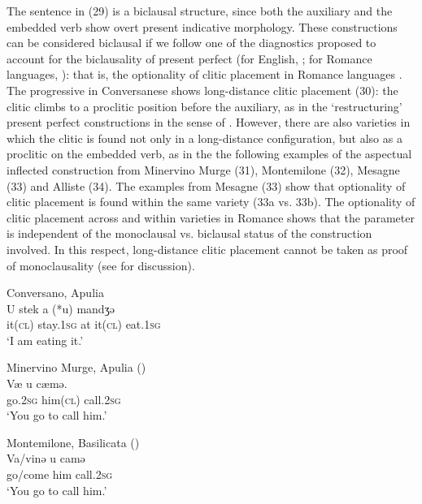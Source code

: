 \documentclass[output=paper]{langsci/langscibook}
\begin{document}
The sentence in (29) is a biclausal structure, since both the auxiliary and the embedded verb show overt present indicative morphology. These constructions can be considered biclausal if we follow one of the diagnostics proposed to account for the biclausality of present perfect (for English, \citealt{Chomsky1957,Chomsky1981,Chomsky1995}; for Romance languages, \citealt{Kayne1993,Manzini2005,Manzini2007,Manzini2011Bio}): that is, the optionality of clitic placement in Romance languages \citep{Manzini2011Bio}. The progressive in Conversanese shows long-distance clitic placement (30): the clitic climbs to a proclitic position before the auxiliary, as in the ‘restructuring’ present perfect constructions in the sense of \citet{Rizzi1982}. However, there are also varieties in which the clitic is found not only in a long-distance configuration, but also as a proclitic on the embedded verb, as in the the following examples of the aspectual inflected construction from Minervino Murge (31), Montemilone (32), Mesagne (33) and Alliste (34). The examples from Mesagne (33) show that optionality of clitic placement is found within the same variety (33a vs. 33b). The optionality of clitic placement across and within varieties in Romance shows that the parameter is independent of the monoclausal vs. biclausal status of the construction involved. In this respect, long-distance clitic placement cannot be taken as proof of monoclausality (see \citealt{Manzini2011Bio,Manzini2017} for discussion).

\ea%
         Conversano, Apulia\label{ex:lorusso:30}\\
    \gll U   stek    a   (*u)  mandʒə \\
         it\textsc{(cl)} stay.\textsc{1sg} at  it\textsc{(cl)} eat.\textsc{1sg} \\
    \glt ‘I am eating it.’
\z

\ea%
         Minervino Murge, Apulia (\citealt{Manzini2005})\label{ex:lorusso:31}\\
    \gll Væ     u    cæmə. \\
         go.\textsc{2sg} him(\textsc{cl})   call.\textsc{2sg}    \\
    \glt ‘You go to call him.’ 
    \z

\ea%
         Montemilone, Basilicata (\citealt{Manzini2005})\label{ex:lorusso:32}\\
    \gll Va/vinə   u    camə         \\
         go/come  him   call.\textsc{2sg}\\
    \glt ‘You go to call him.’ 
    \z
\end{document}
